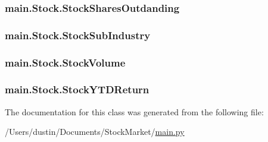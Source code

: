 \subsubsection[{Stock\+Shares\+Outdanding}]{\setlength{\rightskip}{0pt plus 5cm}main.\+Stock.\+Stock\+Shares\+Outdanding}\label{classmain_1_1_stock_a884e45377d572ba964b7e86f37914e0f}
\hypertarget{classmain_1_1_stock_adf3644a84fa90150a5e33b7bc22bb70b}{}
\subsubsection[{Stock\+Sub\+Industry}]{\setlength{\rightskip}{0pt plus 5cm}main.\+Stock.\+Stock\+Sub\+Industry}\label{classmain_1_1_stock_adf3644a84fa90150a5e33b7bc22bb70b}
\hypertarget{classmain_1_1_stock_acdc8aee532419fee7bb9ed6899a85dc8}{}
\subsubsection[{Stock\+Volume}]{\setlength{\rightskip}{0pt plus 5cm}main.\+Stock.\+Stock\+Volume}\label{classmain_1_1_stock_acdc8aee532419fee7bb9ed6899a85dc8}
\hypertarget{classmain_1_1_stock_a8cec4083fb19e7b9e859a5faa4ac357a}{}
\subsubsection[{Stock\+Y\+T\+D\+Return}]{\setlength{\rightskip}{0pt plus 5cm}main.\+Stock.\+Stock\+Y\+T\+D\+Return}\label{classmain_1_1_stock_a8cec4083fb19e7b9e859a5faa4ac357a}


The documentation for this class was generated from the following file\+:\begin{DoxyCompactItemize}
\item 
/\+Users/dustin/\+Documents/\+Stock\+Market/\hyperlink{main_8py}{main.\+py}\end{DoxyCompactItemize}
